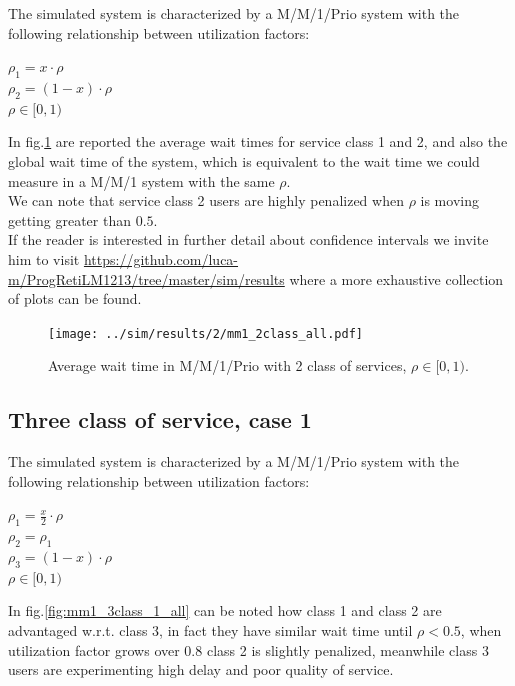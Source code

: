 \documentclass{llncs}
\newcommand{\labelsec}[1]{\label{sec:#1}}
\begin{document}
The simulated system is characterized by a M/M/1/Prio system with the following relationship between utilization factors:
\begin{center}
$\rho_1 = x \cdot \rho $\\
$\rho_2 = (1-x) \cdot \rho $\\
$\rho \in [0,1)$\\
\end{center}

In fig.\ref{fig:mm1_2class_all} are reported the average wait times for service class 1 and 2, and also the global wait time of the system, which is equivalent to the wait time we could measure in a M/M/1 system with the same $\rho$.\\
We can note that service class 2 users are highly penalized when $\rho$ is moving getting greater than $0.5$.\\
If the reader is interested in further detail about confidence intervals we invite him to visit \url{https://github.com/luca-m/ProgRetiLM1213/tree/master/sim/results} where a more exhaustive collection of plots can be found.

\begin{figure}
\centering
\texttt{[image: ../sim/results/2/mm1\_2class\_all.pdf]}
\caption{Average wait time in M/M/1/Prio with 2 class of services, $\rho \in [0,1)$.}
\label{fig:mm1_2class_all}
\end{figure}
\newpage
\subsection{Three class of service, case 1}
\labelsec{MG1PRIO_3class_1}

The simulated system is characterized by a M/M/1/Prio system with the following relationship between utilization factors:

\begin{center}
$\rho_1 = \frac{x}{2} \cdot \rho $\\
$\rho_2 = \rho_1$ \\
$\rho_3 = (1-x) \cdot \rho$\\
$\rho \in [0,1)$\\
\end{center}

In fig.\ref{fig:mm1_3class_1_all} can be noted how class 1 and class 2 are advantaged w.r.t. class 3, in fact they have similar wait time until $\rho < 0.5$, when utilization factor grows over $0.8$ class 2 is slightly penalized, meanwhile class 3 users are experimenting high delay and poor quality of service.
\end{document}
